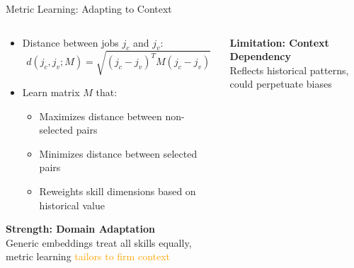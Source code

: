 \documentclass{beamer}
\begin{document}
\begin{frame}{Metric Learning: Adapting to Context}
\begin{columns}
\begin{column}{0.48\textwidth}
\begin{itemize}
    \item Distance between jobs $j_c$ and $j_v$:
    \begin{equation}
    d(j_c, j_v; M) = \sqrt{(j_c - j_v)^T M(j_c - j_v)}
    \end{equation}
    
    \item Learn matrix $M$ that:
    \begin{itemize}
        \item Maximizes distance between non-selected pairs
        \item Minimizes distance between selected pairs
        \item Reweights skill dimensions based on historical value
    \end{itemize}
\end{itemize}

\begin{tcolorbox}[colback=boxbackground,colframe=boxframe,sharp corners]
\textbf{Strength: Domain Adaptation}\\
Generic embeddings treat all skills equally, metric learning \textcolor{orange}{tailors to firm context}
\end{tcolorbox}
\end{column}
\begin{column}{0.48\textwidth}

\begin{tcolorbox}[colback=boxbackground,colframe=boxframe,sharp corners]
\textbf{Limitation: Context Dependency}\\
Reflects historical patterns, could perpetuate biases
\end{tcolorbox}
\end{column}
\end{columns}
\end{frame}
\end{document}
